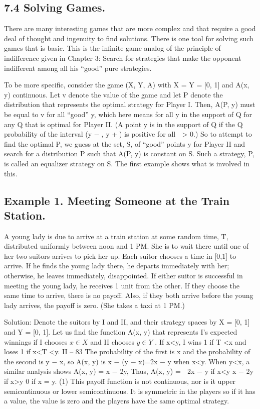\documentclass[]{report}
\begin{document}
\subsection{7.4 Solving Games.} There are many interesting games that are more complex and
that require a good deal of thought and ingenuity to find solutions. There is one tool
for solving such games that is basic. This is the infinite game analog of the principle of
indifference given in Chapter 3: Search for strategies that make the opponent indifferent
among all his “good” pure strategies.

To be more specific, consider the game (X, Y, A) with X = Y = [0, 1] and A(x, y)
continuous. Let v denote the value of the game and let P denote the distribution that
represents the optimal strategy for Player I. Then, A(P, y) must be equal to v for all
“good” y, which here means for all y in the support of Q for any Q that is optimal for
Player II. (A point y is in the support of Q if the Q probability of the interval (y −, y +)
is positive for all  > 0.) So to attempt to find the optimal P, we guess at the set, S, of
“good” points y for Player II and search for a distribution P such that A(P, y) is constant
on S. Such a strategy, P, is called an equalizer strategy on S. The first example shows
what is involved in this.
\subsection{Example 1. Meeting Someone at the Train Station.} A young lady is due to
arrive at a train station at some random time, T, distributed uniformly between noon and
1 PM. She is to wait there until one of her two suitors arrives to pick her up. Each suitor
chooses a time in [0,1] to arrive. If he finds the young lady there, he departs immediately
with her; otherwise, he leaves immediately, disappointed. If either suitor is successful in
meeting the young lady, he receives 1 unit from the other. If they choose the same time
to arrive, there is no payoff. Also, if they both arrive before the young lady arrives, the
payoff is zero. (She takes a taxi at 1 PM.)


Solution: Denote the suitors by I and II, and their strategy spaces by X = [0, 1]
and Y = [0, 1]. Let us find the function A(x, y) that represents I’s expected winnings if I
chooses $x \in X$ and II chooses $y \in Y$ . If x<y, I wins 1 if T <x and loses 1 if x<T <y.
II – 83
The probability of the first is x and the probability of the second is y − x, so A(x, y) is
x − (y − x)=2x − y when x<y. When y<x, a similar analysis shows A(x, y) = x − 2y,
Thus,
A(x, y) =  2x − y if x<y
x − 2y if x>y
0 if x = y.
(1)
This payoff function is not continuous, nor is it upper semicontinuous or lower semicontinuous.
It is symmetric in the players so if it has a value, the value is zero and the players
have the same optimal strategy.
\end{document}
